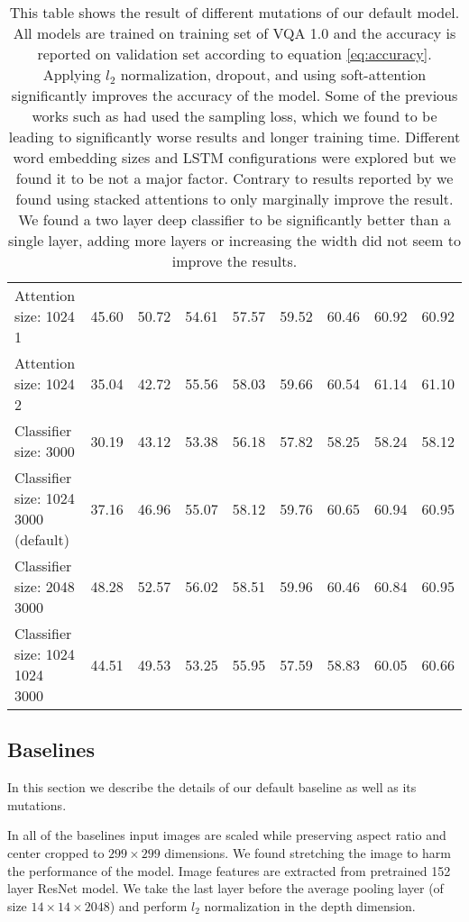 \documentclass[10pt,twocolumn,letterpaper]{article}
\begin{document}
\begin{table*}
\begin{tabular}{l c c c c c c c c}
		Attention size: 1024 1 & 45.60 & 50.72 & 54.61 & 57.57 & 59.52 & 60.46 & 60.92 & 60.92 \\
		Attention size: 1024 2 & 35.04 & 42.72 & 55.56 & 58.03 & 59.66 & 60.54 & 61.14 & 61.10 \\
		\midrule
		Classifier size: 3000 & 30.19 & 43.12 & 53.38 & 56.18 & 57.82 & 58.25 & 58.24 & 58.12 \\
		Classifier size: 1024 3000 (default) & 37.16 & 46.96 & 55.07 & 58.12 & 59.76 & 60.65 & 60.94 & 60.95 \\
		Classifier size: 2048 3000 & 48.28 & 52.57 & 56.02 & 58.51 & 59.96 & 60.46 & 60.84 & 60.95 \\
		Classifier size: 1024 1024 3000 & 44.51 & 49.53 & 53.25 & 55.95 & 57.59 & 58.83 & 60.05 & 60.66 \\
		\bottomrule
	\end{tabular}
	\vspace{.1cm}
	\caption{This table shows the result of different mutations of our default model. All models are trained on training set of VQA 1.0 \cite{Antol2015VQAVQ} and the accuracy is reported on validation set according to equation \ref{eq:accuracy}.  Applying $l_2$ normalization, dropout, and using soft-attention significantly improves the accuracy of the model. Some of the previous works such as \cite{Fukui2016MultimodalCB} had used the sampling loss, which we found to be leading to significantly worse results and longer training time. Different word embedding sizes and LSTM configurations were explored but we found it to be not a major factor.  Contrary to results reported by \cite{Yang2016StackedAN} we found using stacked attentions to only marginally improve the result. We found a two layer deep classifier to be significantly better than a single layer, adding more layers or increasing the width did not seem to improve the results.} 
	\label{table:baselines}
\end{table*}


\subsection{Baselines}
In this section we describe the details of our default baseline as well as its mutations.

In all of the baselines input images are scaled while preserving aspect ratio and center cropped to $299 \times 299$ dimensions. We found stretching the image to harm the performance of the model. Image features are extracted from pretrained 152 layer ResNet \cite{He2016DeepRL} model. We take the last layer before the average pooling layer (of size $14 \times 14 \times 2048$) and perform $l_2$ normalization in the depth dimension. 
\end{document}
